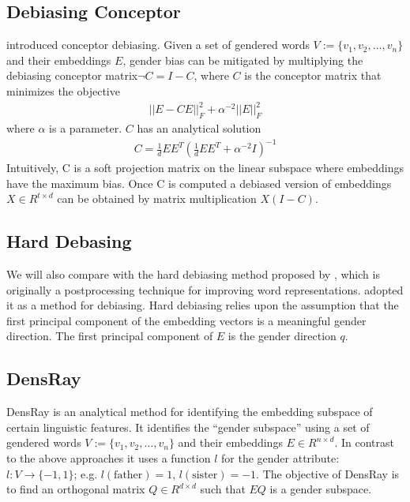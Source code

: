 \subsection{Debiasing Conceptor}
 introduced conceptor debiasing. Given a set of gendered words $V:=\{v_1,v_2,\dots,v_n\}$ and their embeddings $E$, gender bias can be mitigated by multiplying the debiasing conceptor matrix$\neg C= I-C$, where $C$ is the conceptor matrix that minimizes the objective
\begin{eqnarray}
||E-CE||^2_F+\alpha^{-2}||E||^2_F
\end{eqnarray}
where $\alpha$ is a parameter. $C$ has an analytical solution
\begin{eqnarray}
C=\frac{1}{d}EE^{T}(\frac{1}{d}EE^{T}+\alpha^{-2}I)^{-1}
\end{eqnarray}
Intuitively, C is a soft projection matrix on the linear subspace where embeddings have the maximum bias. 
Once C is computed a debiased version of embeddings $X \in R^{t \times d}$  can be obtained by matrix multiplication $X(I-C)$.

\subsection{Hard Debasing}
We will also compare with the hard debiasing method proposed
by , which is originally a postprocessing
technique for improving word
representations.  adopted it as a
method for debiasing. Hard debiasing relies upon
the assumption that the first principal component of the
embedding vectors is a meaningful gender direction. The first principal component of $E$ is the gender direction $q$.

\subsection{DensRay}
DensRay \cite{dufter2019analytical} is an analytical method for identifying the
embedding subspace of certain linguistic features. It
identifies the ``gender subspace'' using a set of gendered words
$V:=\{v_1,v_2,\dots,v_n\}$ and their embeddings $E \in
R^{n\times d}$. In contrast to the above approaches it uses a function $l$ for the gender attribute:
$l:V\to \{-1,1\}$;
e.g. $l(\mbox{father})=1$, $l(\mbox{sister})=-1$. The objective of DensRay
is to find an orthogonal matrix $Q\in R^{d\times d}$ such
that $EQ$ is  a gender subspace.

